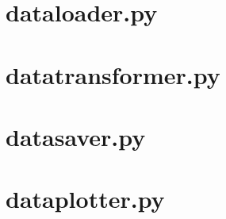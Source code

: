 \section{dataloader.py}

\section{datatransformer.py}

\section{datasaver.py}

\section{dataplotter.py}


% 

 
